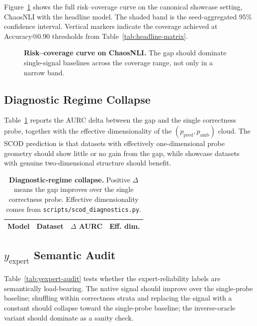 Figure~\ref{fig:chaosnli-rc} shows the full risk--coverage curve on the
canonical showcase setting, ChaosNLI with the headline model. The shaded band
is the seed-aggregated 95\% confidence interval. Vertical markers indicate the
coverage achieved at Accuracy@0.90 thresholds from
Table~\ref{tab:headline-matrix}.

\begin{figure}[t]
\centering
\caption{\textbf{Risk--coverage curve on ChaosNLI.} The gap should dominate
single-signal baselines across the coverage range, not only in a narrow band.}
\label{fig:chaosnli-rc}
\end{figure}

\subsection{Diagnostic Regime Collapse}
\label{sec:results-diagnostic}

Table~\ref{tab:diagnostic-collapse} reports the AURC delta between the gap and
the single correctness probe, together with the effective dimensionality of the
$(p_{\mathrm{pred}}, p_{\mathrm{amb}})$ cloud. The SCOD prediction is that
datasets with effectively one-dimensional probe geometry should show little or
no gain from the gap, while showcase datasets with genuine two-dimensional
structure should benefit.

\begin{table}[t]
\centering
\caption{\textbf{Diagnostic-regime collapse.} Positive $\Delta$ means the gap
improves over the single correctness probe. Effective dimensionality comes from
\texttt{scripts/scod\_diagnostics.py}.}
\label{tab:diagnostic-collapse}
\begin{tabular}{llrr}
\toprule
Model & Dataset & $\Delta$ AURC & Eff. dim. \\
\midrule
\bottomrule
\end{tabular}
\end{table}

\subsection{\texorpdfstring{$y_{\mathrm{expert}}$}{y expert} Semantic Audit}
\label{sec:results-yexpert-audit}

Table~\ref{tab:yexpert-audit} tests whether the expert-reliability labels are
semantically load-bearing. The native signal should improve over the
single-probe baseline; shuffling within correctness strata and replacing the
signal with a constant should collapse toward the single-probe baseline; the
inverse-oracle variant should dominate as a sanity check.

